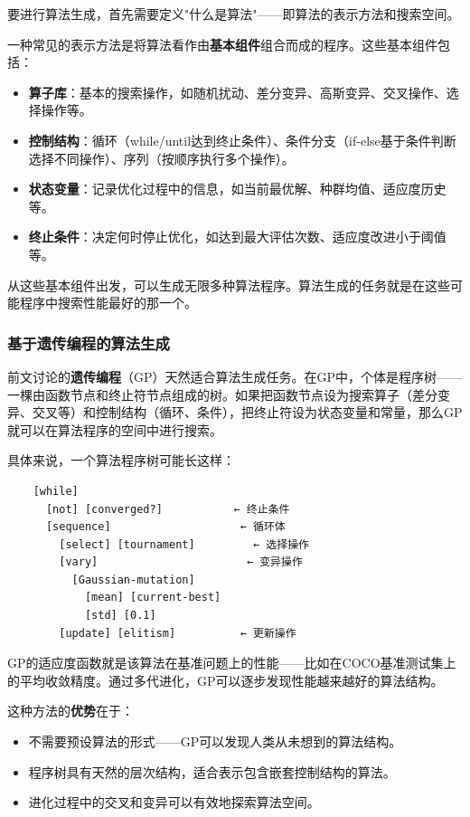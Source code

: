 \documentclass[lang=cn,zihao=-4,a4paper,fontset=windows]{beautybook}
\begin{document}
要进行算法生成，首先需要定义"什么是算法"——即算法的表示方法和搜索空间。

一种常见的表示方法是将算法看作由\textbf{基本组件}组合而成的程序。这些基本组件包括：
\begin{itemize}
    \item \textbf{算子库}：基本的搜索操作，如随机扰动、差分变异、高斯变异、交叉操作、选择操作等。
    \item \textbf{控制结构}：循环（while/until达到终止条件）、条件分支（if-else基于条件判断选择不同操作）、序列（按顺序执行多个操作）。
    \item \textbf{状态变量}：记录优化过程中的信息，如当前最优解、种群均值、适应度历史等。
    \item \textbf{终止条件}：决定何时停止优化，如达到最大评估次数、适应度改进小于阈值等。
\end{itemize}

从这些基本组件出发，可以生成无限多种算法程序。算法生成的任务就是在这些可能程序中搜索性能最好的那一个。

\subsubsection{基于遗传编程的算法生成}

前文讨论的\textbf{遗传编程}（GP）天然适合算法生成任务。在GP中，个体是程序树——一棵由函数节点和终止符节点组成的树。如果把函数节点设为搜索算子（差分变异、交叉等）和控制结构（循环、条件），把终止符设为状态变量和常量，那么GP就可以在算法程序的空间中进行搜索。

具体来说，一个算法程序树可能长这样：
\begin{verbatim}
    [while]
      [not] [converged?]           ← 终止条件
      [sequence]                    ← 循环体
        [select] [tournament]         ← 选择操作
        [vary]                       ← 变异操作
          [Gaussian-mutation]
            [mean] [current-best]
            [std] [0.1]
        [update] [elitism]          ← 更新操作
\end{verbatim}

GP的适应度函数就是该算法在基准问题上的性能——比如在COCO基准测试集上的平均收敛精度。通过多代进化，GP可以逐步发现性能越来越好的算法结构。

这种方法的\textbf{优势}在于：
\begin{itemize}
    \item 不需要预设算法的形式——GP可以发现人类从未想到的算法结构。
    \item 程序树具有天然的层次结构，适合表示包含嵌套控制结构的算法。
    \item 进化过程中的交叉和变异可以有效地探索算法空间。
\end{itemize}
\end{document}
